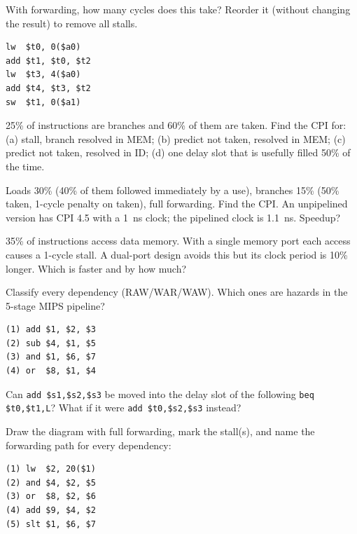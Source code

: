 \documentclass[11pt]{article}
\begin{document}
\begin{exercise}\label{p:sched}
With forwarding, how many cycles does this take? Reorder it (without changing
the result) to remove all stalls.
\begin{lstlisting}
lw  $t0, 0($a0)
add $t1, $t0, $t2
lw  $t3, 4($a0)
add $t4, $t3, $t2
sw  $t1, 0($a1)
\end{lstlisting}
\end{exercise}

\begin{exercise}\label{p:branch}
25\% of instructions are branches and 60\% of them are taken. Find the CPI
for: (a) stall, branch resolved in MEM; (b) predict not taken, resolved in
MEM; (c) predict not taken, resolved in ID; (d) one delay slot that is
usefully filled 50\% of the time.
\end{exercise}

\begin{exercise}\label{p:mix}
Loads 30\% (40\% of them followed immediately by a use), branches 15\% (50\%
taken, 1-cycle penalty on taken), full forwarding. Find the CPI. An
unpipelined version has CPI 4.5 with a 1~ns clock; the pipelined clock is
1.1~ns. Speedup?
\end{exercise}

\begin{exercise}\label{p:struct}
35\% of instructions access data memory. With a single memory port each
access causes a 1-cycle stall. A dual-port design avoids this but its clock
period is 10\% longer. Which is faster and by how much?
\end{exercise}

\begin{exercise}\label{p:classify}
Classify every dependency (RAW/WAR/WAW). Which ones are hazards in the
5-stage MIPS pipeline?
\begin{lstlisting}
(1) add $1, $2, $3
(2) sub $4, $1, $5
(3) and $1, $6, $7
(4) or  $8, $1, $4
\end{lstlisting}
\end{exercise}

\begin{exercise}\label{p:slot}
Can \texttt{add \$s1,\$s2,\$s3} be moved into the delay slot of the
following \texttt{beq \$t0,\$t1,L}? What if it were
\texttt{add \$t0,\$s2,\$s3} instead?
\end{exercise}

\begin{exercise}\label{p:draw}
Draw the diagram with full forwarding, mark the stall(s), and name the
forwarding path for every dependency:
\begin{lstlisting}
(1) lw  $2, 20($1)
(2) and $4, $2, $5
(3) or  $8, $2, $6
(4) add $9, $4, $2
(5) slt $1, $6, $7
\end{lstlisting}
\end{exercise}
\end{document}
